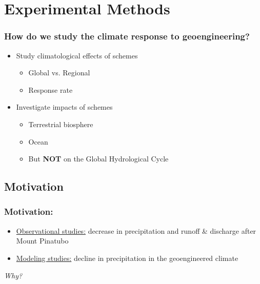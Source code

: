 \documentclass{beamer}
\begin{document}
\section{Experimental Methods}
\begin{frame}
\frametitle{How do we study the climate response to geoengineering?}

\hspace{3cm} \color{bgblue} 
\vspace{0.5cm}
\begin{itemize}
	\item Study climatological effects of schemes
		\begin{itemize}
			\item Global vs. Regional
			\item Response rate
		\end{itemize}
	\item Investigate impacts of schemes 
		\begin{itemize}
			\item Terrestrial biosphere
			\item Ocean
			\item But {\color{red}\bf NOT} on the Global Hydrological Cycle
		\end{itemize}
\end{itemize}
\end{frame}


\subsection{Motivation}
\begin{frame}
\frametitle{Motivation:}
\begin{itemize}
	\item \underline {Observational studies:} decrease in precipitation and runoff \& discharge after Mount Pinatubo
\vspace{1cm}
	\item \underline {Modeling studies:} decline in precipitation in the geoengineered climate
\end{itemize}

\begin {center}
\vspace{1cm}
	{\color{bgblue}\it \Huge Why?}
\end {center}
\end{frame}
\end{document}
